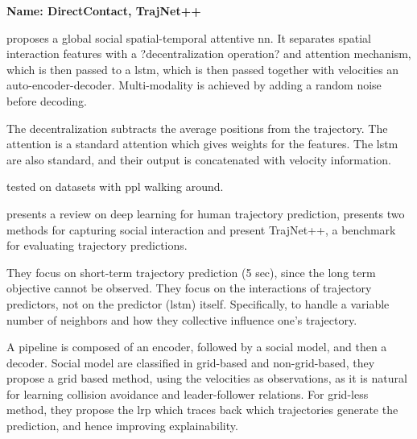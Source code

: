 \textbf{Name: DirectContact, TrajNet++}




\cite{xu2021tra2tra} proposes a global social spatial-temporal attentive \gls{nn}. 
%
It separates spatial interaction features with a ?decentralization operation? and attention mechanism, which is then passed to a \gls{lstm}, which is then passed together with velocities an auto-encoder-decoder.
%
Multi-modality is achieved by adding a random noise before decoding.

The decentralization subtracts the average positions from the trajectory.
%
The attention is a standard attention which gives weights for the features.
%
The \gls{lstm} are also standard, and their output is concatenated with velocity information.

tested on datasets with ppl walking around.

\cite{kothari2021human} presents a review on deep learning for human trajectory prediction, presents two methods for capturing social interaction and present TrajNet++, a benchmark for evaluating trajectory predictions. 

They focus on short-term trajectory prediction (5 sec), since the long term objective cannot be observed.
%
They focus on the interactions of trajectory predictors, not on the predictor (\gls{lstm}) itself.
%
Specifically, to handle a variable number of neighbors and how they collective influence one's trajectory.

A pipeline is composed of an encoder, followed by a social model, and then a decoder.
%
Social model are classified in grid-based and non-grid-based, they propose a grid based method, using the velocities as observations, as it is natural for learning collision avoidance and leader-follower relations.
%
For grid-less method, they propose the \gls{lrp} which traces back which trajectories generate the prediction, and hence improving explainability.



\cite{navarro2022social}


\cite{zhou2023csr}


\cite{peng2023mrgtraj}
